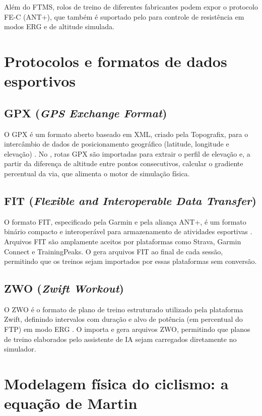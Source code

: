 Além do FTMS, rolos de treino de diferentes fabricantes podem expor o protocolo
FE-C (ANT+), que também é suportado pelo \argus{} para controle de resistência
em modos ERG e de altitude simulada.

\section{Protocolos e formatos de dados esportivos}
\label{sec:formatos}

\subsection{GPX (\textit{GPS Exchange Format})}
\label{sec:gpx}

O GPX é um formato aberto baseado em XML, criado pela Topografix, para o
intercâmbio de dados de posicionamento geográfico (latitude, longitude e
elevação) \cite{gpx2004}. No \argus{}, rotas GPX são importadas para extrair o
perfil de elevação e, a partir da diferença de altitude entre pontos
consecutivos, calcular o gradiente percentual da via, que alimenta o motor de
simulação física.

\subsection{FIT (\textit{Flexible and Interoperable Data Transfer})}
\label{sec:fit}

O formato FIT, especificado pela Garmin e pela aliança ANT+, é um formato
binário compacto e interoperável para armazenamento de atividades esportivas
\cite{garmin2024}. Arquivos FIT são amplamente aceitos por plataformas como
Strava, Garmin Connect e TrainingPeaks. O \argus{} gera arquivos FIT ao final
de cada sessão, permitindo que os treinos sejam importados por essas
plataformas sem conversão.

\subsection{ZWO (\textit{Zwift Workout})}
\label{sec:zwo}

O ZWO é o formato de plano de treino estruturado utilizado pela plataforma
Zwift, definindo intervalos com duração e alvo de potência (em percentual do
FTP) em modo ERG \cite{zwift2024}. O \argus{} importa e gera arquivos ZWO,
permitindo que planos de treino elaborados pelo assistente de IA sejam
carregados diretamente no simulador.

\section{Modelagem física do ciclismo: a equação de Martin}
\label{sec:equacao-martin}


